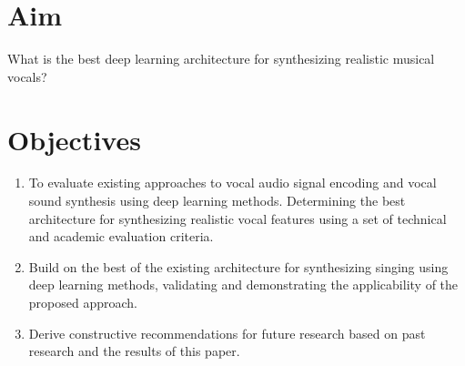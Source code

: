 \section{Aim}

What is the best deep learning architecture for synthesizing realistic musical vocals?

\section{Objectives}

\begin{enumerate}
    \item To evaluate existing approaches to vocal audio signal encoding and vocal sound synthesis using deep learning methods. Determining the best architecture for synthesizing realistic vocal features using a set of technical and academic evaluation criteria.
    \item Build on the best of the existing architecture for synthesizing singing using deep learning methods, validating and demonstrating the applicability of the proposed approach.
    \item Derive constructive recommendations for future research based on past research and the results of this paper.
\end{enumerate}